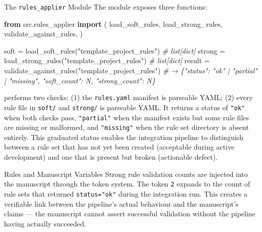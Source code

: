 \documentclass[
  ignorenonframetext,
]{beamer}
\newenvironment{Shaded}{}{}
\newcommand{\CommentTok}[1]{\textcolor[rgb]{0.38,0.63,0.69}{\textit{#1}}}
\newcommand{\ImportTok}[1]{\textcolor[rgb]{0.00,0.50,0.00}{\textbf{#1}}}
\newcommand{\NormalTok}[1]{#1}
\newcommand{\OperatorTok}[1]{\textcolor[rgb]{0.40,0.40,0.40}{#1}}
\newcommand{\StringTok}[1]{\textcolor[rgb]{0.25,0.44,0.63}{#1}}
\begin{document}
\begin{frame}{The \texttt{rules\_applier}
Module}
\protect{}\label{the-rules_applier-module}
The  module exposes three functions:

\begin{Shaded}
\begin{Highlighting}[]
\ImportTok{from}\NormalTok{ src.rules\_applier }\ImportTok{import}\NormalTok{ (}
\NormalTok{    load\_soft\_rules,}
\NormalTok{    load\_strong\_rules,}
\NormalTok{    validate\_against\_rules,}
\NormalTok{)}

\NormalTok{soft   }\OperatorTok{=}\NormalTok{ load\_soft\_rules(}\StringTok{"template\_project\_rules"}\NormalTok{)    }\CommentTok{\# list[dict]}
\NormalTok{strong }\OperatorTok{=}\NormalTok{ load\_strong\_rules(}\StringTok{"template\_project\_rules"}\NormalTok{)  }\CommentTok{\# list[dict]}
\NormalTok{result }\OperatorTok{=}\NormalTok{ validate\_against\_rules(}\StringTok{"template\_project\_rules"}\NormalTok{)}
\CommentTok{\# → \{"status": "ok" | "partial" | "missing", "soft\_count": N, "strong\_count": N\}}
\end{Highlighting}
\end{Shaded}

 performs two checks: (1) the
\texttt{rules.yaml} manifest is parseable YAML; (2) every rule file in
\texttt{soft/} and \texttt{strong/} is parseable YAML. It returns a
status of \texttt{"ok"} when both checks pass, \texttt{"partial"} when
the manifest exists but some rule files are missing or malformed, and
\texttt{"missing"} when the rule set directory is absent entirely. This
graduated status enables the integration pipeline to distinguish between
a rule set that has not yet been created (acceptable during active
development) and one that is present but broken (actionable defect).
\end{frame}

\begin{frame}{Rules and Manuscript Variables}
\protect{}\label{rules-and-manuscript-variables}
Strong rule validation counts are injected into the manuscript through
the token system. The token \texttt{2} expands to the count of rule sets
that returned \texttt{status="ok"} during the integration run. This
creates a verifiable link between the pipeline's actual behaviour and
the manuscript's claims --- the manuscript cannot assert successful
validation without the pipeline having actually succeeded.
\end{frame}
\end{document}
